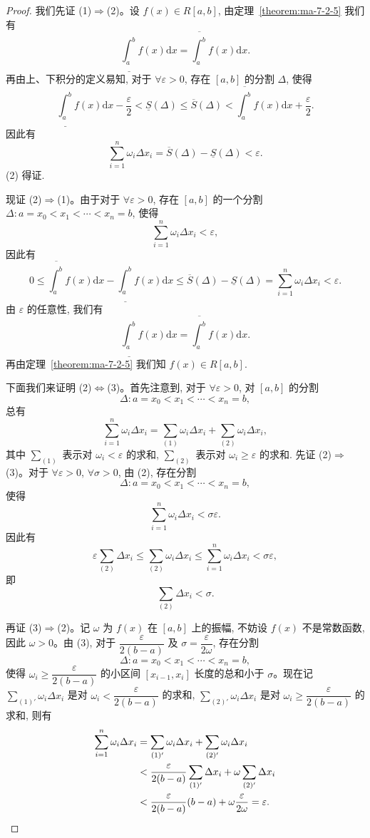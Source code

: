 \begin{proof}
我们先证 (1)$\Rightarrow$(2)。设 $f(x)\in R[a,b]$, 由定理~\ref{theorem:ma-7-2-5} 我们有
\[
  \underline{\int_a^b} f(x)\mathrm dx=\overline{\int_a^b} f(x)\mathrm dx.
\]
再由上、下积分的定义易知, 对于 $\forall\varepsilon>0$, 存在 $[a,b]$ 的分割 $\Delta$, 使得
\[
  \underline{\int_a^b} f(x)\mathrm dx-\frac{\varepsilon}{2}<\underline S(\Delta)\leq \overline S(\Delta)<\overline{\int_a^b} f(x)\mathrm dx+\frac{\varepsilon}{2}.
\]
因此有
\[
  \sum_{i=1}^n \omega_i\Delta x_i=\overline S(\Delta)-\underline S(\Delta)<\varepsilon.
\]
(2) 得证.

现证 (2)$\Rightarrow$(1)。由于对于 $\forall\varepsilon>0$, 存在 $[a,b]$ 的一个分割 $\Delta:a=x_0<x_1<\cdots<x_n=b$, 使得
\[
  \sum_{i=1}^n \omega_i\Delta x_i<\varepsilon,
\]
因此有
\[
  0\leq \overline{\int_a^b} f(x)\mathrm dx-\underline{\int_a^b} f(x)\mathrm dx
  \leq \overline S(\Delta)-\underline S(\Delta)
  =\sum_{i=1}^n\omega_i\Delta x_i<\varepsilon.
\]
由 $\varepsilon$ 的任意性, 我们有
\[
  \underline{\int_a^b} f(x)\mathrm dx=\overline{\int_a^b} f(x)\mathrm dx.
\]
再由定理~\ref{theorem:ma-7-2-5} 我们知 $f(x)\in R[a,b]$.

下面我们来证明 (2)$\Longleftrightarrow$(3)。首先注意到, 对于 $\forall\varepsilon>0$, 对 $[a,b]$ 的分割
\[
  \Delta:a=x_0<x_1<\cdots<x_n=b,
\]
总有
\[
  \sum_{i=1}^n\omega_i\Delta x_i=\sum_{(1)}\omega_i\Delta x_i+\sum_{(2)}\omega_i\Delta x_i,
\]
其中 $\sum_{(1)}$ 表示对 $\omega_i<\varepsilon$ 的求和, $\sum_{(2)}$ 表示对 $\omega_i\geq\varepsilon$ 的求和.
先证 (2)$\Rightarrow$(3)。对于 $\forall\varepsilon>0$, $\forall\sigma>0$, 由 (2), 存在分割
\[
  \Delta:a=x_0<x_1<\cdots<x_n=b,
\]
使得
\[
  \sum_{i=1}^n\omega_i\Delta x_i<\sigma\varepsilon.
\]
因此有
\[
  \varepsilon\sum_{(2)}\Delta x_i\leq \sum_{(2)}\omega_i\Delta x_i\leq \sum_{i=1}^n\omega_i\Delta x_i<\sigma\varepsilon,
\]
即
\[
  \sum_{(2)}\Delta x_i<\sigma.
\]

再证 (3)$\Rightarrow$(2)。记 $\omega$ 为 $f(x)$ 在 $[a,b]$ 上的振幅, 不妨设 $f(x)$ 不是常数函数, 因此 $\omega>0$。由 (3), 对于 $\dfrac{\varepsilon}{2(b-a)}$ 及 $\sigma=\dfrac{\varepsilon}{2\omega}$, 存在分割
\[
  \Delta:a=x_0<x_1<\cdots<x_n=b,
\]
使得 $\omega_i\geq\dfrac{\varepsilon}{2(b-a)}$ 的小区间 $[x_{i-1},x_i]$ 长度的总和小于 $\sigma$。现在记 $\sum_{(1)'}\omega_i\Delta x_i$ 是对 $\omega_i<\dfrac{\varepsilon}{2(b-a)}$ 的求和, $\sum_{(2)'}\omega_i\Delta x_i$ 是对 $\omega_i\geq\dfrac{\varepsilon}{2(b-a)}$ 的求和, 则有
\[
\begin{aligned}
  \sum_{i=1}^n\omega_i\Delta x_i
  &=\sum_{(1)'}\omega_i\Delta x_i+\sum_{(2)'}\omega_i\Delta x_i\\
  &<\frac{\varepsilon}{2(b-a)}\sum_{(1)'}\Delta x_i+\omega\sum_{(2)'}\Delta x_i\\
  &<\frac{\varepsilon}{2(b-a)}(b-a)+\omega\frac{\varepsilon}{2\omega}
  =\varepsilon.
\end{aligned}
\qedhere
\]
\end{proof}


